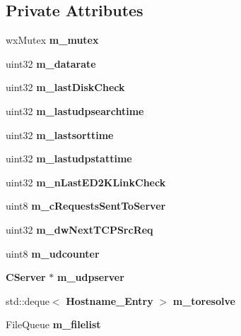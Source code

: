 \subsection*{Private Attributes}
\begin{DoxyCompactItemize}
\item 
wxMutex {\bf m\_\-mutex}\label{classCDownloadQueue_a015ae83ec6c131dbaca7c4486573a453}

\item 
uint32 {\bfseries m\_\-datarate}\label{classCDownloadQueue_a1a40cc6b02b8d3a4db76a3d3d70eb562}

\item 
uint32 {\bfseries m\_\-lastDiskCheck}\label{classCDownloadQueue_a73ed21c3f7d081a777042edde51205ad}

\item 
uint32 {\bfseries m\_\-lastudpsearchtime}\label{classCDownloadQueue_a125e501960c589252a5ddd8a7a41080e}

\item 
uint32 {\bfseries m\_\-lastsorttime}\label{classCDownloadQueue_a2663496ab39445e0b060e1df97e030b0}

\item 
uint32 {\bfseries m\_\-lastudpstattime}\label{classCDownloadQueue_a43f99ae867bff68b82399e27299d5839}

\item 
uint32 {\bfseries m\_\-nLastED2KLinkCheck}\label{classCDownloadQueue_a0787f5ecc74f6a1d647c0698f7422e93}

\item 
uint8 {\bfseries m\_\-cRequestsSentToServer}\label{classCDownloadQueue_ab98c054fbe31b02e2fe716d999bf787f}

\item 
uint32 {\bfseries m\_\-dwNextTCPSrcReq}\label{classCDownloadQueue_a2d7086422ead3e8922be314fb5a6f0a0}

\item 
uint8 {\bfseries m\_\-udcounter}\label{classCDownloadQueue_a48a0c5e8ea21764725209595c63680cc}

\item 
{\bf CServer} $\ast$ {\bfseries m\_\-udpserver}\label{classCDownloadQueue_a74b1577d1cd010a64b62381814c1b362}

\item 
std::deque$<$ {\bf Hostname\_\-Entry} $>$ {\bfseries m\_\-toresolve}\label{classCDownloadQueue_a5ac90959ff4cca4bf41a12429fb59893}

\item 
FileQueue {\bfseries m\_\-filelist}\label{classCDownloadQueue_af2c472b222f7d8214d4979f4d2dc7d8e}


\end{DoxyCompactItemize}
